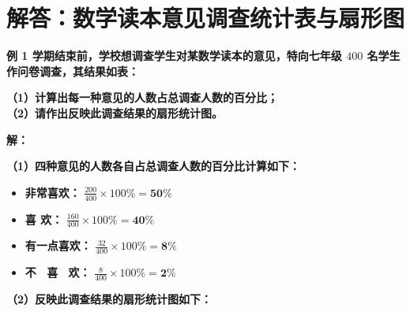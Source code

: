 \section{解答：数学读本意见调查统计表与扇形图}

\vspace{0.6cm}

\textbf{例 1 \quad 学期结束前，学校想调查学生对某数学读本的意见，特向七年级 $400$ 名学生作问卷调查，其结果如表：}

\vspace{0.2cm}
\begin{center}
\renewcommand{\arraystretch}{1.6}
\end{center}

\vspace{0.4cm}

\textbf{（1）计算出每一种意见的人数占总调查人数的百分比；} \\
\textbf{（2）请作出反映此调查结果的扇形统计图。}

\vspace{0.4cm}
\textbf{解：}

\textbf{（1）四种意见的人数各自占总调查人数的百分比计算如下：}
\begin{itemize}
    \item \textbf{非常喜欢：} $\displaystyle \frac{200}{400} \times 100\% = \boldsymbol{50\%}$
    \vspace{0.1cm}
    \item \textbf{喜 \qquad 欢：} $\displaystyle \frac{160}{400} \times 100\% = \boldsymbol{40\%}$
    \vspace{0.1cm}
    \item \textbf{有一点喜欢：} $\displaystyle \frac{32}{400} \times 100\% = \boldsymbol{8\%}$
    \vspace{0.1cm}
    \item \textbf{不 \ 喜 \ 欢：} $\displaystyle \frac{8}{400} \times 100\% = \boldsymbol{2\%}$
\end{itemize}

\vspace{0.4cm}
\textbf{（2）反映此调查结果的扇形统计图如下：}

